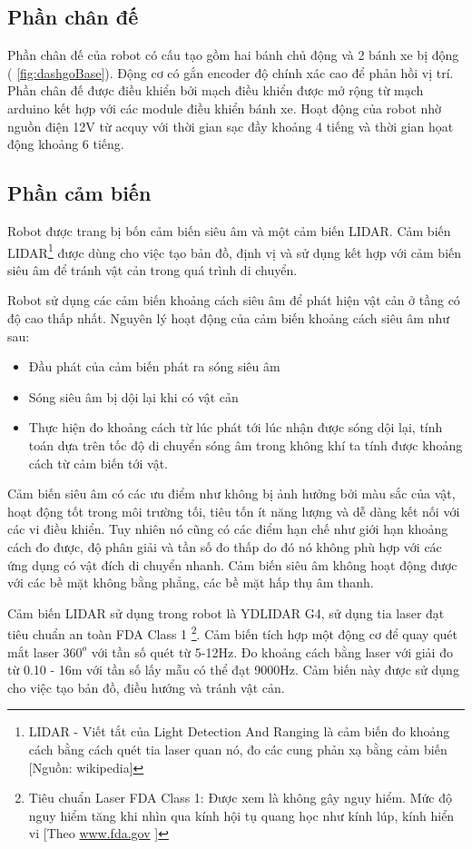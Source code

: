 \subsection{Phần chân đế}
Phần chân đế của robot có cấu tạo gồm hai bánh chủ động và 2 bánh xe bị động (\figurename{ \ref{fig:dashgoBase}}). Động cơ có gắn encoder độ chính xác cao để phản hồi vị trí. Phần chân đế được điều khiển bởi mạch điều khiển được mở rộng từ mạch arduino kết hợp với các module điều khiển bánh xe. Hoạt động của robot nhờ nguồn điện 12V từ acquy với thời gian sạc đầy khoảng 4 tiếng và thời gian họat động khoảng 6 tiếng.

\subsection{Phần cảm biến}
Robot được trang bị bốn cảm biến siêu âm và một cảm biến LIDAR. Cảm biến LIDAR\footnote{LIDAR - Viết tắt của  Light Detection And Ranging là cảm biến đo khoảng cách bằng cách quét tia laser quan nó, đo các cung phản xạ bằng cảm biến [Nguồn: wikipedia]} được dùng cho việc tạo bản đồ, định vị và sử dụng kết hợp với cảm biến siêu âm để tránh vật cản trong quá trình di chuyển.

Robot sử dụng các cảm biến khoảng cách siêu âm để phát hiện vật cản ở tầng có độ cao thấp nhất. Nguyên lý hoạt động của cảm biến khoảng cách siêu âm như sau:
\begin{itemize}
    \item Đầu phát của cảm biến phát ra sóng siêu âm
    \item Sóng siêu âm bị dội lại khi có vật cản
    \item Thực hiện đo khoảng cách từ lúc phát tới lúc nhận được sóng dội lại, tính toán dựa trên tốc độ di chuyển sóng âm trong không khí ta tính được khoảng cách từ cảm biến tới vật.
\end{itemize}
Cảm biến siêu âm có các ưu điểm như không bị ảnh hưởng bởi màu sắc của vật, hoạt động tốt trong môi trường tối, tiêu tốn ít năng lượng và dễ dàng kết nối với các vi điều khiển. Tuy nhiên nó cũng có các điểm hạn chế như giới hạn khoảng cách đo được, độ phân giải và tần số đo thấp do đó nó không phù hợp với các ứng dụng có vật đích di chuyển nhanh. Cảm biến siêu âm không hoạt động được với các bề mặt không bằng phẳng, các bề mặt hấp thụ âm thanh.

Cảm biến LIDAR sử dụng trong robot là YDLIDAR G4, sử dụng tia laser đạt tiêu chuẩn an toàn FDA Class 1 \footnote{Tiêu chuẩn Laser FDA Class 1: Được xem là không gây nguy hiểm. Mức độ nguy hiểm tăng khi nhìn qua kính hội tụ quang học như kính lúp, kính hiển vi [Theo \url{www.fda.gov} ]}.
Cảm biến tích hợp một động cơ để quay quét mắt laser ${360}^{o}$ với tần số quét từ 5-12Hz. Đo khoảng cách bằng laser với giải đo từ 0.10 - 16m với tần số lấy mẫu có thể đạt 9000Hz.
Cảm biến này được sử dụng cho việc tạo bản đồ, điều hướng và tránh vật cản.


